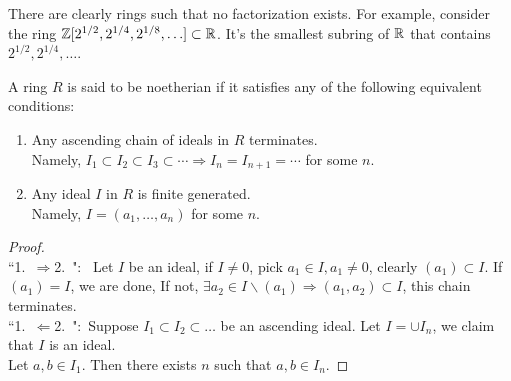 \documentclass{mynotes}
\begin{document}
\begin{remark}
There are clearly rings such that no factorization exists. For example, consider the ring $\mathbb{Z}[2^{1/2},2^{1/4},2^{1/8},\ldots]\subset \mathbb{R}$. It's the smallest subring of $\mathbb{R}$ that contains $2^{1/2},2^{1/4},\ldots$.
\end{remark}
\begin{definition}
A ring $R$ is said to be noetherian if it satisfies any of the following equivalent conditions:
\begin{enumerate}
\item Any ascending chain of ideals in $R$ terminates.\\
Namely, $I_1\subset I_2\subset I_3\subset \cdots\Rightarrow I_n = I_{n+1}=\cdots$ for some $n$.
\item Any ideal $I$ in $R$ is finite generated.\\
Namely, $I=(a_1,\ldots,a_n)$ for some $n$.
\end{enumerate}
\end{definition}
\begin{proof}
\mbox{}\\\mbox{``1.\ $\Rightarrow$2.\ ": } Let $I$ be an ideal, if $I\ne0$, pick $a_1\in I, a_1\neq 0$, clearly $(a_1)\subset I$. 
If $(a_1)=I$, we are done, If not,
$\exists a_2\in I\backslash(a_1)\Rightarrow (a_1,a_2)\subset I $, this chain terminates.\\
\mbox{``1.\ $\Leftarrow$2.\ ": }Suppose $I_1\subset I_2\subset \ldots$ be an ascending ideal. Let $I = \cup I_n$, we claim that $I$ is an ideal.\\
Let $a,b\in I_1$. Then there exists $n$ such that $a,b\in I_n$.
\end{proof}
\end{document}
